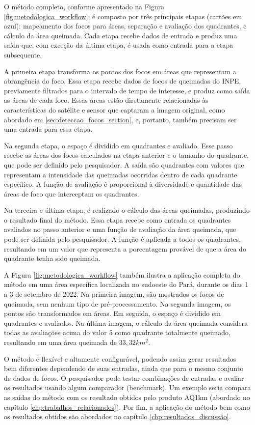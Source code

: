 \documentclass[cic,tc]{iiufrgs}
\begin{document}
O método completo, conforme apresentado na Figura \ref{fig:metodologica_workflow}, é composto por três principais etapas (cartões em azul): mapeamento dos focos para áreas, separação e avaliação dos quadrantes, e cálculo da área queimada. Cada etapa recebe dados de entrada e produz uma saída que, com exceção da última etapa, é usada como entrada para a etapa subsequente.

A primeira etapa transforma os pontos dos focos em áreas que representam a abrangência do foco. Essa etapa recebe dados de focos de queimadas do INPE, previamente filtrados para o intervalo de tempo de interesse, e produz como saída as áreas de cada foco. Essas áreas estão diretamente relacionadas às características do satélite e sensor que captaram a imagem original, como abordado em \ref{sec:deteccao_focos_section}, e, portanto, também precisam ser uma entrada para essa etapa.

Na segunda etapa, o espaço é dividido em quadrantes e avaliado. Esse passo recebe as áreas dos focos calculados na etapa anterior e o tamanho do quadrante, que pode ser definido pelo pesquisador. A saída são quadrantes com valores que representam a intensidade das queimadas ocorridas dentro de cada quadrante específico. A função de avaliação é proporcional à diversidade e quantidade das áreas de foco que interceptam os quadrantes.

Na terceira e última etapa, é realizado o cálculo das áreas queimadas, produzindo o resultado final do método. Essa etapa recebe como entrada os quadrantes avaliados no passo anterior e uma função de avaliação da área queimada, que pode ser definida pelo pesquisador. A função é aplicada a todos os quadrantes, resultando em um valor que representa a porcentagem provável de que a área do quadrante tenha sido queimada.

A Figura \ref{fig:metodologica_workflow} também ilustra a aplicação completa do método em uma área específica localizada no sudoeste do Pará, durante os dias 1 a 3 de setembro de 2022. Na primeira imagem, são mostrados os focos de queimada, sem nenhum tipo de pré-processamento. Na segunda imagem, os pontos são transformados em áreas. Em seguida, o espaço é dividido em quadrantes e avaliados. Na última imagem, o cálculo da área queimada considera todas as avaliações acima do valor 5 como quadrante totalmente queimado, resultando em uma área queimada de $33,32 km^2$.

O método é flexível e altamente configurável, podendo assim gerar resultados bem diferentes dependendo de suas entradas, ainda que para o mesmo conjunto de dados de focos. O pesquisador pode testar combinações de entradas e avaliar os resultados usando algum comparador (benchmark). Um exemplo seria compara as saídas do método com os resultado obtidos pelo produto AQ1km (abordado no capítulo \ref{chp:trabalhos_relacionados}). Por fim, a aplicação do método bem como os resultados obtidos são abordados no capítulo \ref{chp:resultados_discussão}.
\end{document}
